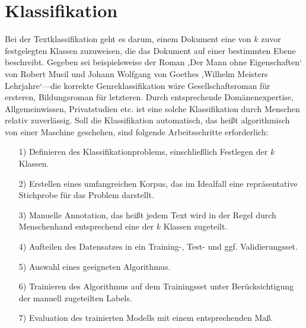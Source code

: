 \section{Klassifikation}
\label{klassifikation}
Bei der Textklassifikation geht es darum, einem Dokument eine von $k$ zuvor festgelegten Klassen zuzuweisen, die das Dokument auf einer bestimmten Ebene beschreibt. Gegeben sei beispielsweise der Roman ,Der Mann ohne Eigenschaften` von Robert Musil und Johann Wolfgang von Goethes ,Wilhelm Meisters Lehrjahre`---die korrekte Genreklassifikation wäre Gesellschaftsroman für ersteren, Bildungsroman für letzteren. Durch entsprechende Domänenexpertise, Allgemeinwissen, Privatstudien etc. ist eine solche Klassifikation durch Menschen relativ zuverlässig. Soll die Klassifikation automatisch, das heißt algorithmisch von einer Maschine geschehen, sind folgende Arbeitsschritte erforderlich:

\begin{itemize}
  \item[1)] Definieren des Klassifikationproblems, einschließlich Festlegen der $k$ Klassen.
  \item[2)] Erstellen eines umfangreichen Korpus, das im Idealfall eine repräsentative Stichprobe für das Problem darstellt.
  \item[3)] Manuelle Annotation, das heißt jedem Text wird in der Regel durch Menschenhand entsprechend eine der $k$ Klassen zugeteilt.
  \item[4)] Aufteilen des Datensatzes in ein Training-, Test- und ggf. Validierungsset.
  \item[5)] Auswahl eines geeigneten Algorithmus.
  \item[6)] Trainieren des Algorithmus auf dem Trainingsset unter Berücksichtigung der manuell zugeteilten Labels.
  \item[7)] Evaluation des trainierten Modells mit einem entsprechenden Maß.
\end{itemize}

